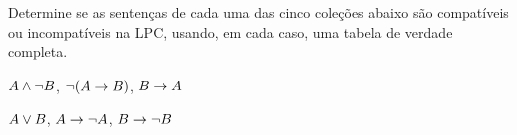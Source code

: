 \problempart
\label{pr.TT.satisfiable2}
Determine se as sentenças de cada uma das cinco coleções abaixo são compatíveis ou incompatíveis na LPC, usando, em cada caso, uma tabela de verdade completa.
\begin{earg}
\item $A \wedge \neg B$, $\neg(A \rightarrow B)$, $B \rightarrow A$\vspace{.5ex} %


\item $A \vee B$, $A \rightarrow \neg A$, $B \rightarrow \neg B$ \vspace{.5ex}%



\end{earg}
